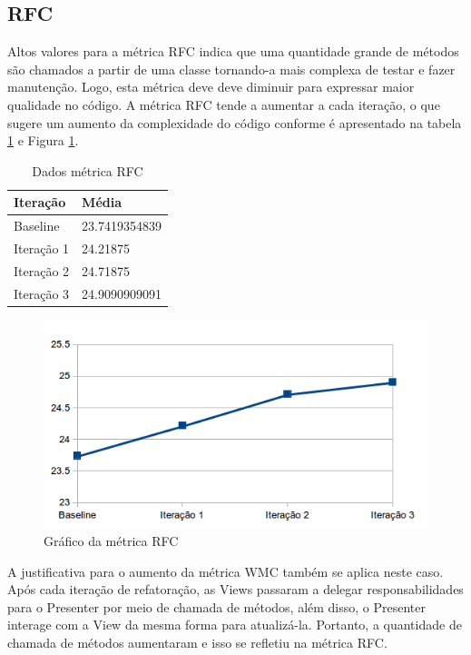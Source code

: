 \subsection{RFC}

Altos valores para a métrica RFC indica que uma quantidade grande de métodos são
chamados a partir de uma classe tornando-a mais complexa de testar e fazer
manutenção. Logo, esta métrica deve deve diminuir para expressar maior
qualidade no código. A métrica RFC tende a aumentar a cada iteração, o que
sugere um aumento da complexidade do código conforme é apresentado na tabela \ref{tab:rfc} e Figura
\ref{fig:rfc}.

\begin{table}[!h]
	\centering
	    \caption{Dados métrica RFC}
    \begin{tabular}{ | l | l | }
    \hline
    Iteração & Média 			\\ \hline
    Baseline & 23.7419354839   	\\ \hline
    Iteração 1 & 24.21875		\\ \hline
	Iteração 2 & 24.71875		\\ \hline
	Iteração 3 & 24.9090909091	\\ \hline
    \end{tabular}
    \label{tab:rfc}
\end{table}

\begin{figure}[!htb]
	\label{fig:rfc}
	\caption{Gráfico da métrica RFC}   
	\begin{center}
		\includegraphics{img/rfc.png}
	\end{center}
\end{figure}


A justificativa para o aumento da métrica WMC também se aplica neste caso.
Após cada iteração de refatoração, as Views passaram a delegar
responsabilidades para o Presenter por meio de chamada de métodos, além disso, o Presenter interage com a
View da mesma forma para atualizá-la. Portanto, a quantidade de chamada de
métodos aumentaram e isso se refletiu na métrica RFC.

